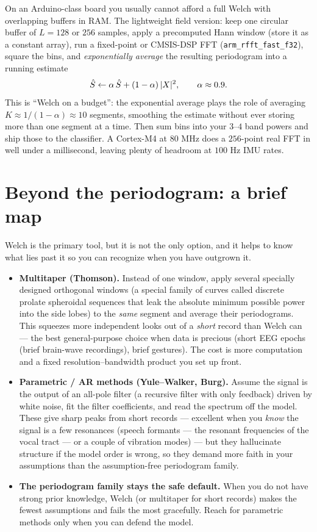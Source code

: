 \begin{buildbox}
On an Arduino-class board you usually cannot afford a full Welch with overlapping
buffers in RAM. The lightweight field version: keep one circular buffer of $L=128$
or $256$ samples, apply a precomputed Hann window (store it as a constant array),
run a fixed-point or CMSIS-DSP FFT (\texttt{arm\_rfft\_fast\_f32}), square the bins,
and \emph{exponentially average} the resulting periodogram into a running estimate
\[
\hat S \leftarrow \alpha\,\hat S + (1-\alpha)\,\lvert X\rvert^2, \qquad \alpha\approx 0.9.
\]
This is ``Welch on a budget'': the exponential average plays the role of averaging
$K\approx 1/(1-\alpha)\approx 10$ segments, smoothing the estimate without ever
storing more than one segment at a time. Then sum bins into your $3$--$4$ band
powers and ship those to the classifier. A Cortex-M4 at $80$ MHz does a $256$-point
real FFT in well under a millisecond, leaving plenty of headroom at $100$ Hz IMU
rates.
\end{buildbox}

\section{Beyond the periodogram: a brief map}
\label{ch21:beyond}

Welch is the primary tool, but it is not the only option, and it helps to know what
lies past it so you can recognize when you have outgrown it.

\begin{itemize}
\item \textbf{Multitaper (Thomson).} Instead of one window, apply several specially
designed orthogonal windows (a special family of curves called discrete prolate spheroidal sequences that leak the absolute minimum possible power into the side lobes) to the
\emph{same} segment and average their periodograms. This squeezes more independent
looks out of a \emph{short} record than Welch can --- the best general-purpose
choice when data is precious (short EEG epochs (brief brain-wave recordings), brief gestures). The cost is more
computation and a fixed resolution--bandwidth product you set up front.
\item \textbf{Parametric / AR methods (Yule--Walker, Burg).} Assume the signal is
the output of an all-pole filter (a recursive filter with only feedback) driven by white noise, fit the filter
coefficients, and read the spectrum off the model. These give sharp peaks from
short records --- excellent when you \emph{know} the signal is a few resonances
(speech formants --- the resonant frequencies of the vocal tract --- or a couple of vibration modes) --- but they hallucinate structure
if the model order is wrong, so they demand more faith in your assumptions than the
assumption-free periodogram family.
\item \textbf{The periodogram family stays the safe default.} When you do not have
strong prior knowledge, Welch (or multitaper for short records) makes the fewest
assumptions and fails the most gracefully. Reach for parametric methods only when
you can defend the model.
\end{itemize}

